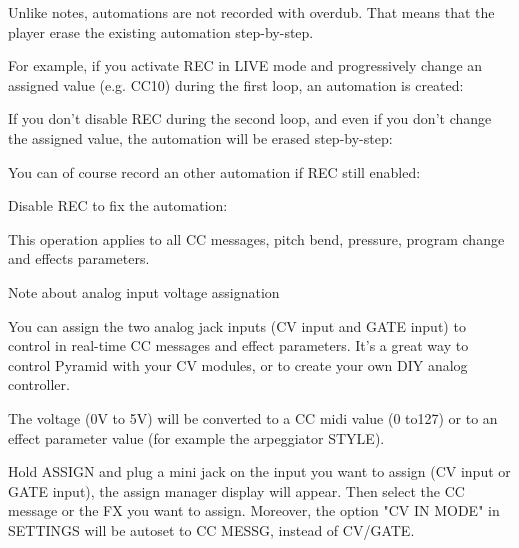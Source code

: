 Unlike notes, automations are not recorded with overdub. That means that the player erase the existing automation step-by-step.

For example, if you activate REC  in LIVE mode and progressively change an assigned value (e.g. CC10) during the first loop, an automation is created:









If you don't disable REC  during the second loop, and even if you don't change the assigned value, the automation will be erased step-by-step:







You can of course record an other automation if REC  still enabled:



Disable REC  to fix the automation:



This operation applies to all CC messages, pitch bend, pressure, program change and effects parameters.

Note about analog input voltage assignation

You can assign the two analog jack inputs (CV input and GATE input) to control in real-time CC messages and effect parameters. It's a great way to control Pyramid with your CV modules, or to create your own DIY analog controller.

The voltage (0V to 5V) will be converted to a CC midi value (0 to127) or to an effect parameter value (for example the arpeggiator STYLE).

Hold ASSIGN and plug a mini jack on the input you want to assign (CV input or GATE input), the assign manager display will appear. Then select the CC message or the FX you want to assign. Moreover, the option "CV IN MODE" in SETTINGS will be autoset to CC MESSG, instead of CV/GATE.
